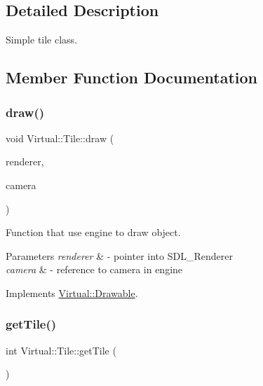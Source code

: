 \subsection{Detailed Description}
Simple tile class. 

\subsection{Member Function Documentation}
\hypertarget{class_virtual_1_1_tile_ac9adb75122a87ec5efb5107b611ba226}{}\label{class_virtual_1_1_tile_ac9adb75122a87ec5efb5107b611ba226} 
\subsubsection{\texorpdfstring{draw()}{draw()}}
{\footnotesize\ttfamily void Virtual\+::\+Tile\+::draw (\begin{DoxyParamCaption}\item[{S\+D\+L\+\_\+\+Renderer $\ast$}]{renderer,  }\item[{\hyperlink{class_virtual_1_1_camera}{Camera} \&}]{camera }\end{DoxyParamCaption})\hspace{0.3cm}{\ttfamily [virtual]}}



Function that use engine to draw object. 


\begin{DoxyParams}{Parameters}
{\em renderer} & -\/ pointer into S\+D\+L\+\_\+\+Renderer \\
\hline
{\em camera} & -\/ reference to camera in engine \\
\hline
\end{DoxyParams}


Implements \hyperlink{class_virtual_1_1_drawable_af7014800911efa59b96e538149e56f8b}{Virtual\+::\+Drawable}.

\hypertarget{class_virtual_1_1_tile_ae535b36cb182c5376739a4d6cdb7306b}{}\label{class_virtual_1_1_tile_ae535b36cb182c5376739a4d6cdb7306b} 
\subsubsection{\texorpdfstring{get\+Tile()}{getTile()}}
{\footnotesize\ttfamily int Virtual\+::\+Tile\+::get\+Tile (\begin{DoxyParamCaption}{ }\end{DoxyParamCaption})}

